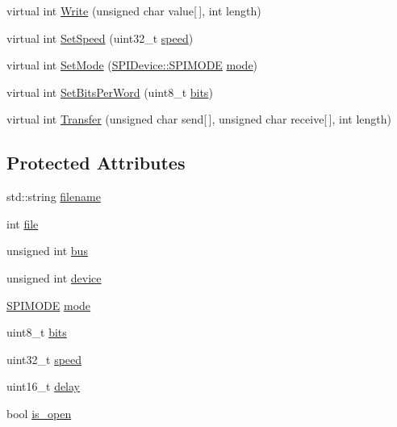 \begin{DoxyCompactItemize}
virtual int \hyperlink{classcubesat_1_1SPIDevice_a68781eba2d69d6552423f5973215be57}{Write} (unsigned char value\mbox{[}$\,$\mbox{]}, int length)
\item 
virtual int \hyperlink{classcubesat_1_1SPIDevice_a43c7d61f64052e2c0a88bcf02a800f89}{Set\+Speed} (uint32\+\_\+t \hyperlink{classcubesat_1_1SPIDevice_a528ce66a8be5dd0df22f7bfab20fda25}{speed})
\item 
virtual int \hyperlink{classcubesat_1_1SPIDevice_a321ab218e4890997ea6bafbd8b8552b5}{Set\+Mode} (\hyperlink{classcubesat_1_1SPIDevice_a68ceaba3194595c2f995f052a337a6d2}{S\+P\+I\+Device\+::\+S\+P\+I\+M\+O\+DE} \hyperlink{classcubesat_1_1SPIDevice_ac69ac6b9e9ac9ed194384a3fa07ecbde}{mode})
\item 
virtual int \hyperlink{classcubesat_1_1SPIDevice_a9b3cfba87ed783827d4d6327fc4144fc}{Set\+Bits\+Per\+Word} (uint8\+\_\+t \hyperlink{classcubesat_1_1SPIDevice_a90b0ab01b41ee231ae0b76327626ad94}{bits})
\item 
virtual int \hyperlink{classcubesat_1_1SPIDevice_abea00136e626117421b2fd62d39404a9}{Transfer} (unsigned char send\mbox{[}$\,$\mbox{]}, unsigned char receive\mbox{[}$\,$\mbox{]}, int length)
\end{DoxyCompactItemize}
\subsection*{Protected Attributes}
\begin{DoxyCompactItemize}
\item 
std\+::string \hyperlink{classcubesat_1_1SPIDevice_a7f77c6e146bb50766894a30b86fcdc69}{filename}
\item 
int \hyperlink{classcubesat_1_1SPIDevice_a5148d986dd64826b359e7952d4e934c2}{file}
\item 
unsigned int \hyperlink{classcubesat_1_1SPIDevice_a4b4e91bed3762e7c7e4399fba3cb386d}{bus}
\item 
unsigned int \hyperlink{classcubesat_1_1SPIDevice_aa771ccb034a870a9188e63600fd4b40a}{device}
\item 
\hyperlink{classcubesat_1_1SPIDevice_a68ceaba3194595c2f995f052a337a6d2}{S\+P\+I\+M\+O\+DE} \hyperlink{classcubesat_1_1SPIDevice_ac69ac6b9e9ac9ed194384a3fa07ecbde}{mode}
\item 
uint8\+\_\+t \hyperlink{classcubesat_1_1SPIDevice_a90b0ab01b41ee231ae0b76327626ad94}{bits}
\item 
uint32\+\_\+t \hyperlink{classcubesat_1_1SPIDevice_a528ce66a8be5dd0df22f7bfab20fda25}{speed}
\item 
uint16\+\_\+t \hyperlink{classcubesat_1_1SPIDevice_a1e885f495c9676ae8238275bfa4b3593}{delay}
\item 
bool \hyperlink{classcubesat_1_1SPIDevice_a5e4f322f5431e85e14a33057c9ec7105}{is\+\_\+open}
\end{DoxyCompactItemize}


